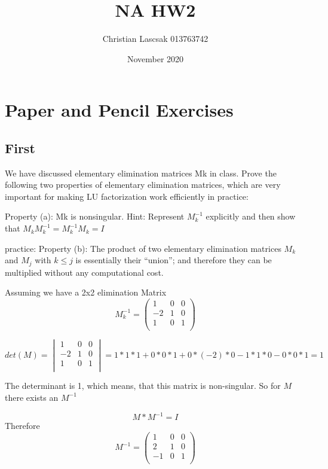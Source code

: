 \documentclass{article}
\title{NA HW2}
\author{Christian Lascsak 013763742}
\date{November 2020}
\begin{document}
\maketitle

\section{Paper and Pencil Exercises}
\subsection{First}
We have discussed elementary elimination matrices Mk in class. Prove the
following two properties of elementary elimination matrices, which are very important for
making LU factorization work efficiently in practice:

\par\noindent
Property (a): Mk is nonsingular.
Hint: Represent \(M_k^{-1}\)
explicitly and then show that \(M_k M_k^{-1} = M_k^{-1} M_k = I\)
\par
\noindent
practice:
Property (b): The product of two elementary elimination matrices \(M_k\) and \(M_j\) with \(k \leq j\) is essentially their “union”; and therefore they can be multiplied without any computational
cost.
\par\noindent
Assuming we have a 2x2 elimination Matrix 
\begin{equation}
    M_k^{-1} =
    \left( 
    \begin{array}{rrrr}
    1 & 0 & 0\\
    -2 & 1 & 0\\
    1 & 0 & 1\\
    \end{array}\right)
\end{equation}

\begin{equation}
    det(M) = \begin{vmatrix}
    1 & 0 & 0\\
    -2 & 1 & 0\\
    1 & 0 & 1\\
    \end{vmatrix} = 1*1*1 + 0*0*1 + 0*(-2)*0 - 1*1*0 - 0*0*1 = 1
\end{equation}

\par\noindent
The determinant is 1, which means, that this matrix is non-singular. So for \(M\) there exists an \(M^{-1}\)

\begin{equation}
    M * M^{-1} = I
\end{equation}
Therefore 
\begin{equation}
    M^{-1} =  \left( \begin{array}{rrrr}
    1 & 0 & 0\\
    2 & 1 & 0\\
    -1 & 0 & 1\\
    \end{array}\right)
\end{equation}
     
\end{document}
